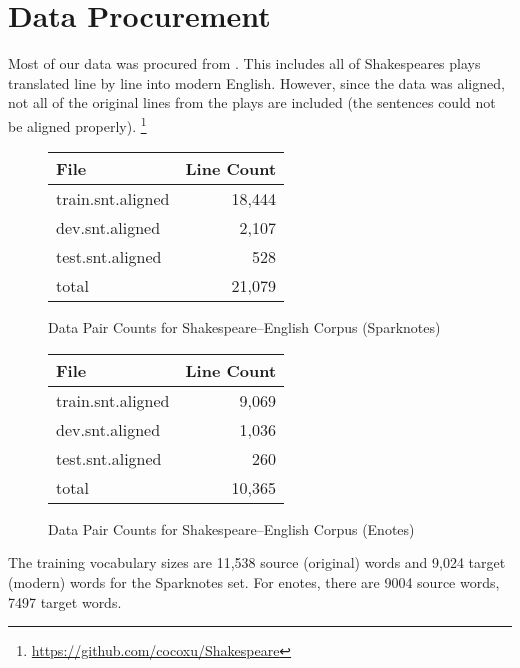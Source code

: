 \documentclass[twoside,twocolumn]{article}
\begin{document}
\section{Data Procurement}
\label{sec:data}
Most of our data was procured from \cite{xu2012paraphrasing}.
This includes all of Shakespeares plays translated line by line into modern
English. However, since the data was aligned, not all of the original lines
from the plays are included (the sentences could not be aligned properly).
\footnote{\url{https://github.com/cocoxu/Shakespeare}}
\begin{figure}[ht]
    \centering
    \begin{tabular}{ |l|r| }
        \hline
        \textbf{File}
          & \textbf{Line Count}\\
        \hline
        train.snt.aligned & 18,444 \\ \hline
        dev.snt.aligned & 2,107 \\ \hline
        test.snt.aligned & 528 \\ \hline
        total & 21,079 \\ \hline
    \end{tabular}

    \caption{Data Pair Counts for Shakespeare--English Corpus (Sparknotes)}
    \label{fig:data-lines-sparknotes}
\end{figure}

\begin{figure}[ht]
    \centering
    \begin{tabular}{ |l|r| }
        \hline
        \textbf{File}
          & \textbf{Line Count}\\
        \hline
        train.snt.aligned & 9,069 \\ \hline
        dev.snt.aligned & 1,036 \\ \hline
        test.snt.aligned & 260 \\ \hline
        total & 10,365 \\ \hline
    \end{tabular}

    \caption{Data Pair Counts for Shakespeare--English Corpus (Enotes)}
    \label{fig:data-lines-enotes}
\end{figure}

The training vocabulary sizes are 11,538 source (original) words and
9,024 target (modern) words for the Sparknotes set. For enotes, there are
9004 source words, 7497 target words.
\end{document}
